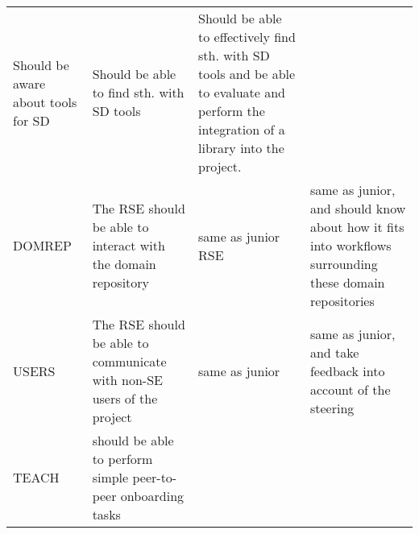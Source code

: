 \documentclass[a4paper
]{article}
\begin{document}
\begin{landscape}
\begin{longtable}[]{@{}llll@{}}
\begin{minipage}[t]{0.28\columnwidth}
Should be aware about tools for SD\strut
\end{minipage} & \begin{minipage}[t]{0.28\columnwidth}\raggedright
Should be able to find sth. with SD tools\strut
\end{minipage} & \begin{minipage}[t]{0.14\columnwidth}\raggedright
Should be able to effectively find sth. with SD tools and be able to
evaluate and perform the integration of a library into the
project.\strut
\end{minipage}\tabularnewline
\begin{minipage}[t]{0.19\columnwidth}\raggedright
DOMREP\strut
\end{minipage} & \begin{minipage}[t]{0.28\columnwidth}\raggedright
The RSE should be able to interact with the domain repository\strut
\end{minipage} & \begin{minipage}[t]{0.28\columnwidth}\raggedright
same as junior RSE\strut
\end{minipage} & \begin{minipage}[t]{0.14\columnwidth}\raggedright
same as junior, and should know about how it fits into workflows
surrounding these domain repositories\strut
\end{minipage}\tabularnewline
\begin{minipage}[t]{0.19\columnwidth}\raggedright
USERS\strut
\end{minipage} & \begin{minipage}[t]{0.28\columnwidth}\raggedright
The RSE should be able to communicate with non-SE users of the
project\strut
\end{minipage} & \begin{minipage}[t]{0.28\columnwidth}\raggedright
same as junior\strut
\end{minipage} & \begin{minipage}[t]{0.14\columnwidth}\raggedright
same as junior, and take feedback into account of the steering\strut
\end{minipage}\tabularnewline
\begin{minipage}[t]{0.19\columnwidth}\raggedright
TEACH\strut
\end{minipage} & \begin{minipage}[t]{0.28\columnwidth}\raggedright
should be able to perform simple peer-to-peer onboarding tasks\strut
\end{minipage} & \begin{minipage}[t]{0.28\columnwidth}\raggedright

\end{minipage}
\end{longtable}
\end{landscape}
\end{document}
